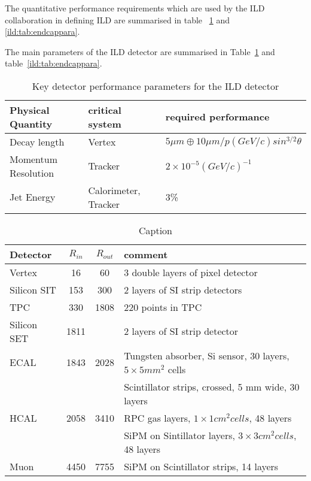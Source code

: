 \documentclass[%
 amsmath,amssymb,
 aps,
]{revtex4-1}
\renewcommand{\toprule}{\hline}
\newcommand{\midrule}{\hline}
\newcommand{\bottomrule}{\hline}
\begin{document}
The quantitative performance requirements which are used by the ILD collaboration in defining ILD are summarised in table~
\ref{ild:tab:barrelpara} and \ref{ild:tab:endcappara}.

The main parameters of the ILD detector are summarised in Table~\ref{ild:tab:barrelpara} and table~\ref{ild:tab:endcappara}.

\begin{table}\small
\begin{center}
    \begin{tabular}{|l|l|l|}
\toprule
Physical Quantity & critical system & required performance\\
\midrule
Decay length & Vertex & $ 5 \mu m \oplus 10 \mu m / p(GeV/c)sin^{3/2}\theta$ \\
\midrule
Momentum Resolution & Tracker & $2 \times 10^{-5} (GeV/c)^{-1}$ \\
\midrule
Jet Energy & Calorimeter, Tracker & 3\% \\
\bottomrule
\end{tabular}
\end{center}
\caption{Key detector performance parameters for the ILD detector}
\label{ild:tab:barrelpara}
\end{table}

\begin{table}[]
    \centering
    \begin{tabular}{l|c|c|l}
        Detector & $R_{in}$ & $R_{out}$ & comment \\
        \midrule
        Vertex & 16 & 60 & 3 double layers of pixel detector \\
        Silicon SIT & 153& 300 & 2 layers of SI strip detectors\\
        TPC & 330 & 1808 & 220 points in TPC \\
        Silicon SET & 1811& & 2 layers of SI strip detector \\
        ECAL & 1843 & 2028 & Tungsten absorber, Si sensor, 30 layers, $5 \times 5 mm^2$ cells\\
             &      &      & Scintillator strips, crossed, 5 mm wide, 30 layers\\
        HCAL & 2058 & 3410 & RPC gas layers, $1 \times 1 cm^2 cells$, 48 layers\\
             &      &      & SiPM on Sintillator layers, $3 \times 3 cm^2 cells$, 48 layers\\
        Muon & 4450 & 7755 & SiPM on Scintillator strips, 14 layers \\
\bottomrule
    \end{tabular}
    \caption{Caption}
    \label{tab:my_label}
\end{table}
\end{document}
